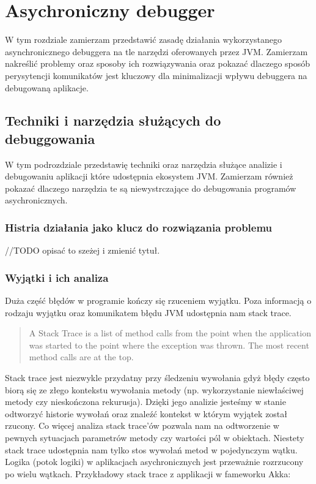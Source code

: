 \chapter{Asychroniczny debugger}

W tym rozdziale zamierzam przedstawić zasadę działania wykorzystanego asynchronicznego debuggera na tle narzędzi oferowanych przez JVM. Zamierzam nakreślić problemy oraz sposoby ich rozwiązywania oraz pokazać dlaczego sposób perysytencji komunikatów jest kluczowy dla minimalizacji wpływu debuggera na debugowaną aplikacje. 


\section{Techniki i narzędzia służących do debuggowania}

W tym podrozdziale przedstawię techniki oraz narzędzia służące analizie i debugowaniu aplikacji które udostępnia ekosystem JVM. Zamierzam również pokazać dlaczego narzędzia te są niewystrczające do debugowania programów asychronicznych.

\subsection{Histria działania jako klucz do rozwiązania problemu}

//TODO opisać to szeżej i zmienić tytuł.

\subsection{Wyjątki i ich analiza}
Duża część błędów w programie kończy się rzuceniem wyjątku. Poza informacją o rodzaju wyjątku oraz komunikatem błędu JVM udostępnia nam stack trace.

\begin{quote}
A Stack Trace is a list of method calls from the point when the application was started to the point where the exception was thrown. The most recent method calls are at the top.~\cite{javaProgramming}
\end{quote} 

Stack trace jest niezwykle przydatny przy śledzeniu wywołania gdyż błędy często biorą się ze złego kontekstu wywołania metody (np. wykorzystanie niewłaściwej metody czy nieskończona rekurusja). Dzięki jego analizie jesteśmy w stanie odtworzyć historie wywołań oraz znaleźć kontekst w którym wyjątek został rzucony. Co więcej analiza stack trace'ów pozwala nam na odtworzenie w pewnych sytuacjach parametrów metody czy wartości pól w obiektach.
Niestety stack trace udostępnia nam tylko stos wywołań metod w pojedynczym wątku. Logika (potok logiki) w aplikacjach asychronicznych jest przeważnie rozrzucony po wielu wątkach. Przykładowy stack trace z applikacji w fameworku Akka:


